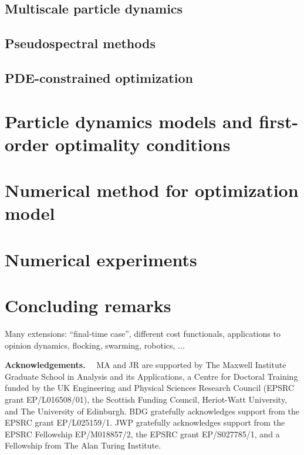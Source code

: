 \documentclass[final]{siamltex}
\begin{document}
\subsection{Multiscale particle dynamics}\label{sec:Background_MPS}




\subsection{Pseudospectral methods}\label{sec:Background_Pseudospectral}




\subsection{PDE-constrained optimization}\label{sec:Background_PDECO}




\section{Particle dynamics models and first-order optimality conditions}\label{sec:Optimality}




\section{Numerical method for optimization model}\label{sec:Method}




\section{Numerical experiments}\label{sec:Expts}


\section{Concluding remarks}\label{sec:Conc}

Many extensions: ``final-time case'', different cost functionals, applications to opinion dynamics, flocking, swarming, robotics, ...


\vspace{0.75em}
\textbf{Acknowledgements.}~~
MA and JR are supported by The Maxwell Institute Graduate School in Analysis and
its Applications, a Centre for Doctoral Training funded by the UK Engineering and Physical Sciences
Research Council (EPSRC grant EP/L016508/01), the Scottish Funding Council, Heriot-Watt University, and
The University of Edinburgh.
%
BDG gratefully acknowledges support from the EPSRC grant EP/L025159/1.
%
JWP gratefully acknowledges support from the EPSRC Fellowship EP/M018857/2, the EPSRC grant EP/S027785/1, and a Fellowship from The Alan Turing Institute. 


\appendix






\end{document}
